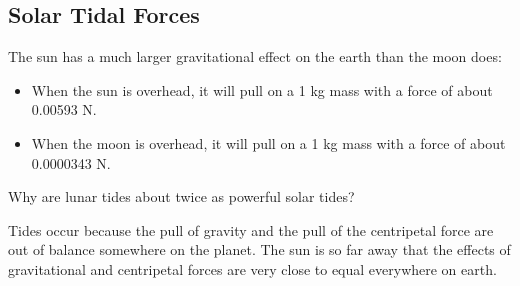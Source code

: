 \subsection{Solar Tidal Forces}

The sun has a much larger gravitational effect on the earth than the moon does:
\begin{itemize}
\item When the sun is overhead,  it will pull on a 1 kg mass with a force of about 0.00593 N.
\item When the moon is overhead,  it will pull on a 1 kg mass with a force of about 0.0000343 N.
\end{itemize}

Why are lunar tides about twice as powerful solar tides?

Tides occur because the pull of gravity and the pull of the centripetal force are out of balance somewhere on the planet.  The sun is so far away that the effects of gravitational and centripetal forces are very close to equal everywhere on earth.





